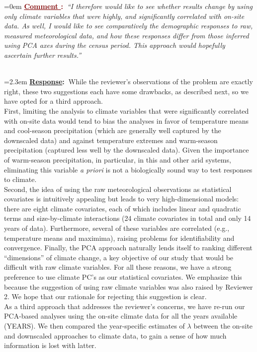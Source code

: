 \documentclass[12pt]{article}
\newcounter{cN}
\newcommand{\comment}[1]{
	\vspace{2em}
	\refstepcounter{cN} %
	\noindent \hangindent=0em \textbf{\textcolor{Maroon}{\uline{Comment \thecN}:~}}\emph{``#1''}
	}
\newcommand{\response}[1]{
	\\[0.25em]
	\hangindent=2.3em \textbf{\textcolor{NavyBlue}{\uline{Response}:~}}#1
	}
\begin{document}
\comment{I therefore would like to see whether results change by using only climate variables that were highly, and significantly correlated with on-site data. As well, I would like to see comparatively the demographic responses to raw, measured meteorological data, and how these responses differ from those inferred using PCA axes during the census period. This approach would hopefully ascertain further results.}
\response{While the reviewer's observations of the problem are exactly right, these two suggestions each have some drawbacks, as described next, so we have opted for a third approach. 
\\
First, limiting the analysis to climate variables that were significantly correlated with on-site data would tend to bias the analyses in favor of temperature means and cool-season precipitation (which are generally well captured by the downscaled data) and against temperature extremes and warm-season precipitation (captured less well by the downscaled data). 
Given the importance of warm-season precipitation, in particular, in this and other arid systems, eliminating this variable \textit{a priori} is not a biologically sound way to test responses to climate. 
\\
Second, the idea of using the raw meteorological observations as statistical covariates is intuitively appealing but leads to very high-dimensional models: there are eight climate covariates, each of which includes linear and quadratic terms and size-by-climate interactions (24 climate covariates in total and only 14 years of data).
Furthermore, several of these variables are correlated (e.g., temperature means and maximima), raising problems for identifiability and convergence.
Finally, the PCA approach naturally lends itself to ranking different ``dimensions'' of climate change, a key objective of our study that would be difficult with raw climate variables. 
For all these reasons, we have a strong preference to use climate PC's as our statistical covariates. 
We emphasize this because the suggestion of using raw climate variables was also raised by Reviewer 2. 
We hope that our rationale for rejecting this suggestion is clear. 
\\
As a third approach that addresses the reviewer's concerns, we have re-run our PCA-based analyses using the on-site climate data for all the years available (YEARS). 
We then compared the year-specific estimates of $\lambda$ between the on-site and downscaled approaches to climate data, to gain a sense of how much information is lost with latter. 
}
\end{document}
